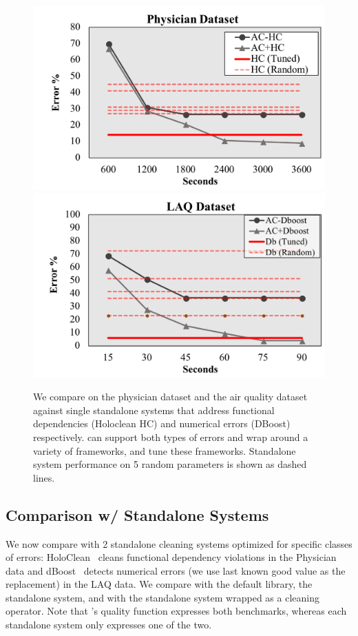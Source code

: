 \begin{figure}[h]
\centering
 \includegraphics[width=0.7\columnwidth]{exp/exp9a.png}
 \includegraphics[width=0.7\columnwidth]{exp/exp9b.png}
 \caption{We compare \sys on the physician dataset and the air quality dataset against single standalone systems that address functional dependencies (Holoclean HC) and numerical errors (DBoost) respectively. \sys can support both types of errors and wrap around a variety of frameworks, and tune these frameworks.  Standalone system performance on 5 random parameters is shown as dashed lines.   \label{exp9}}
\end{figure}

\subsection{Comparison w/ Standalone Systems}
We now compare \sys with 2 standalone cleaning systems optimized for specific classes of  errors: HoloClean~\cite{rekatsinas2017holoclean} cleans functional dependency violations in the Physician data and dBoost~\cite{mariet2016outlier} detects numerical errors (we use last known good value as the replacement) in the LAQ data.  We compare \sys with the default library, the standalone system, and \sys with the standalone system wrapped as a cleaning operator. Note that \sys's quality function expresses both benchmarks, whereas each standalone system only expresses one of the two.

